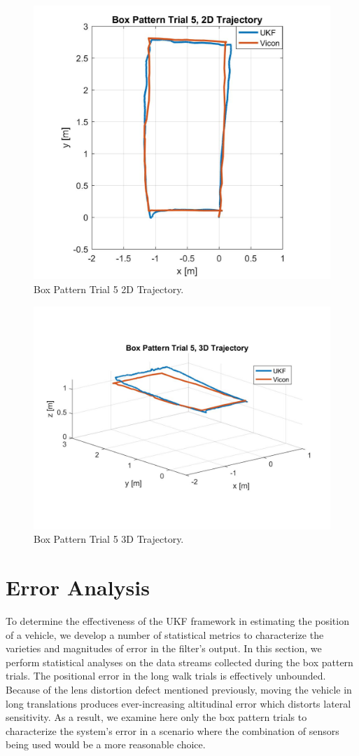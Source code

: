 \begin{figure}[p]
  \centering
    \includegraphics[height=0.6\textwidth]{box5_2d}
  \caption[Box Pattern Trial 5 2D Trajectory]{Box Pattern Trial 5 2D Trajectory.}
  \label{fig:box5_2d}
\end{figure}
\begin{figure}[p]
  \centering
    \includegraphics[height=0.7\textwidth]{box5_3d}
  \caption[Box Pattern Trial 5 3D Trajectory]{Box Pattern Trial 5 3D Trajectory.}
  \label{fig:box5_3d}
\end{figure}
\clearpage

\section{Error Analysis}

To determine the effectiveness of the UKF framework in estimating the position of a vehicle, we develop a number of statistical metrics to characterize the varieties and magnitudes of error in the filter's output. In this section, we perform statistical analyses on the data streams collected during the box pattern trials. The positional error in the long walk trials is effectively unbounded. Because of the lens distortion defect mentioned previously, moving the vehicle in long translations produces ever-increasing altitudinal error which distorts lateral sensitivity. As a result, we examine here only the box pattern trials to characterize the system's error in a scenario where the combination of sensors being used would be a more reasonable choice.

